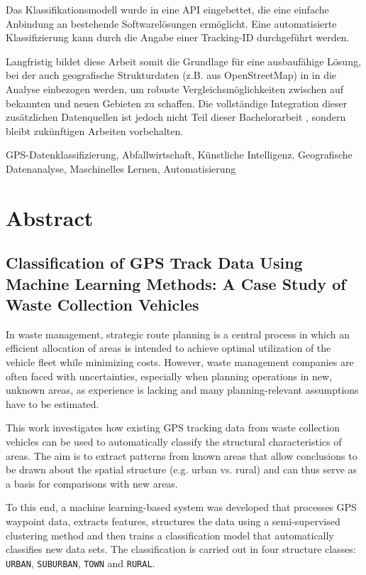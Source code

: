 \documentclass[a4paper,12pt,twoside]{scrreprt}
\begin{document}
Das Klassifikationsmodell wurde in eine API eingebettet, die eine einfache
Anbindung an bestehende Softwarelösungen ermöglicht. Eine automatisierte
Klassifizierung kann durch die Angabe einer
Tracking-ID durchgeführt werden.

Langfristig bildet diese Arbeit somit die Grundlage für eine ausbaufähige
Lösung, bei der auch geografische Strukturdaten (z.B. aus OpenStreetMap) in
in die Analyse einbezogen werden, um robuste Vergleichsmöglichkeiten zwischen
auf
bekannten und neuen Gebieten zu schaffen. Die vollständige Integration dieser
zusätzlichen Datenquellen ist jedoch nicht Teil dieser Bachelorarbeit
, sondern bleibt zukünftigen Arbeiten vorbehalten.

\vspace{0.5cm}

\noindent
GPS-Datenklassifizierung, Abfallwirtschaft, Künstliche Intelligenz,
Geografische Datenanalyse, Maschinelles Lernen, Automatisierung

\newpage
\section*{Abstract}
\subsection*{Classification of GPS Track Data Using Machine Learning Methods:
  A Case Study of
  Waste Collection Vehicles}

In waste management, strategic route planning is a central
process in which an efficient allocation of areas is intended to achieve
optimal
utilization of the vehicle fleet while minimizing costs. However, waste
management companies are often faced with uncertainties, especially when
planning operations in new, unknown areas, as
experience is lacking and many planning-relevant assumptions have to be
estimated.

This work investigates how existing GPS tracking data from
waste collection vehicles can be used to automatically classify the structural
characteristics of
areas. The aim is to extract
patterns from known areas that allow conclusions to be drawn about the spatial
structure (e.g.
urban vs. rural) and can thus serve as a basis for comparisons with new
areas.

To this end, a machine learning-based system was developed that processes
GPS waypoint data, extracts features, structures the data using a
semi-supervised clustering method and then trains a
classification model that automatically classifies new data sets. The
classification is carried out in four structure classes: \texttt{URBAN},
\texttt{SUBURBAN}, \texttt{TOWN} and \texttt{RURAL}.
\end{document}
